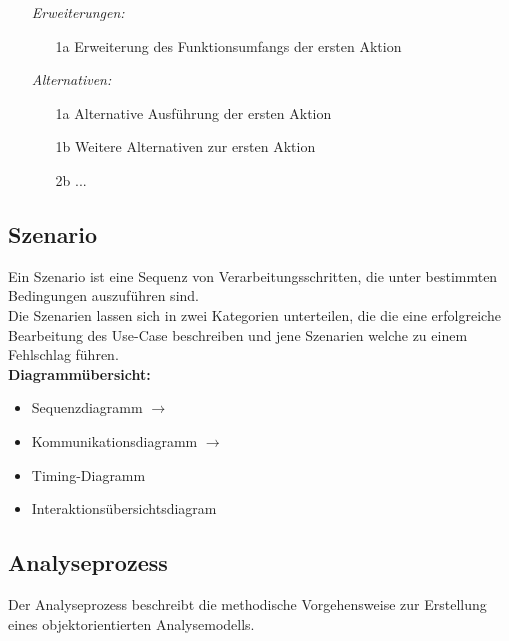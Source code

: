 \begin{description}[leftmargin=2.5cm]
\begin{itemize}[leftmargin=4cm]
        \item[\textit{Erweiterungen:}]
          \begin{enumerate}[leftmargin=0.5cm]
            \item[1a] Erweiterung des Funktionsumfangs der ersten Aktion
          \end{enumerate}
        \item[\textit{Alternativen:}]
          \begin{enumerate}[leftmargin=0.5cm]
            \item[1a] Alternative Ausführung der ersten Aktion
            \item[1b] Weitere Alternativen zur ersten Aktion
            \item[2b] ...
          \end{enumerate}
      \end{itemize}
	\end{description}

	\subsection{Szenario }
  		Ein Szenario ist eine Sequenz von Verarbeitungsschritten, die unter bestimmten
  		Bedingungen auszuführen sind.\\
  		Die Szenarien lassen sich in zwei Kategorien unterteilen, die die eine erfolgreiche Bearbeitung
  des Use-Case beschreiben und jene Szenarien welche zu einem Fehlschlag führen. \\
  
  \textbf{Diagrammübersicht:}
  \begin{multicols}{2}
  	\begin{itemize}[leftmargin=0.5cm]
    	\item Sequenzdiagramm $\rightarrow$ 
    	\item Kommunikationsdiagramm $\rightarrow$ 
    	\item Timing-Diagramm
    	\item Interaktionsübersichtsdiagram
  	\end{itemize}
  \end{multicols}
  
\subsection{Analyseprozess }
  Der Analyseprozess beschreibt die methodische Vorgehensweise zur Erstellung eines
  objektorientierten Analysemodells.\\
  
